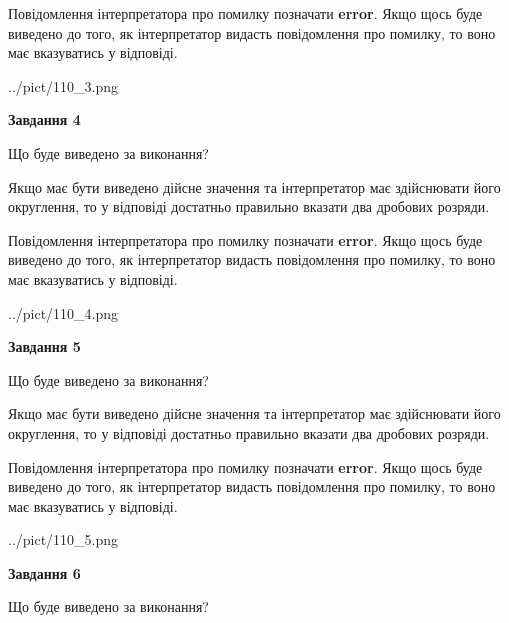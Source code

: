 \documentclass[12pt, ukrainian]{article}
\begin{document}
{\begin {Large}
Повідомлення інтерпретатора про помилку позначати \textbf{error}.
Якщо щось буде виведено до того, як інтерпретатор видасть повідомлення про помилку, 
то воно має вказуватись у відповіді. \par

\begin{center}
	{../pict/110_3.png}
\end{center}
\newpage

{\begin {center}\textbf{Завдання 4}\end {center}}\par
Що буде виведено за виконання? \par

Якщо має бути виведено дійсне значення та інтерпретатор має здійснювати його округлення, 
то у відповіді достатньо правильно вказати два дробових розряди.

Повідомлення інтерпретатора про помилку позначати \textbf{error}.
Якщо щось буде виведено до того, як інтерпретатор видасть повідомлення про помилку, 
то воно має вказуватись у відповіді. \par

\begin{center}
	{../pict/110_4.png}
\end{center}
\newpage

{\begin {center}\textbf{Завдання 5}\end {center}}\par
Що буде виведено за виконання? \par

Якщо має бути виведено дійсне значення та інтерпретатор має здійснювати його округлення, 
то у відповіді достатньо правильно вказати два дробових розряди.

Повідомлення інтерпретатора про помилку позначати \textbf{error}.
Якщо щось буде виведено до того, як інтерпретатор видасть повідомлення про помилку, 
то воно має вказуватись у відповіді. \par

\begin{center}
	{../pict/110_5.png}
\end{center}
\newpage

{\begin {center}\textbf{Завдання 6}\end {center}}\par
Що буде виведено за виконання? \par


\end{Large}}
\end{document}
